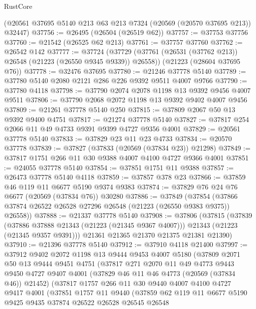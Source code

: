 \begin{lexlean}{RustCore}
\begin{coremodule}
    (@20561 @37695 @5140 @213 @63 @213 @7324 (@20569 (@20570 @37695 @213)) @32447)
@37756 := @26495 (@26504 (@26519 @62))
@37757 := @37753 @37756
@37760 := @21542 (@26525 @62 @213)
@37761 := @37757 @37760
@37762 := @26542 @142
@37777 := @37724
    (@37729 (@37761 (@26531 (@37762 @213)) @26548 (@21223 (@26550 @9345 @9339)) @26558))
    (@21223 (@28604 @37695 @76))
@37778 := @32476 @37695
@37780 := @21246 @37778 @5140
@37789 := @37780 @5140 @2080 @2121 @286 @226 @9392 @9511 @4007 @9766
@37790 := @37780 @4118
@37798 := @37790 @2074 @2078 @1198 @13 @9392 @9456 @4007 @9511
@37806 := @37790 @2068 @2072 @1198 @13 @9392 @9402 @4007 @9456
@37809 := @21261 @37778 @5140 @250
@37815 := @37809 @2067 @50 @13 @9392 @9400 @4751
@37817 := @21274 @37778 @5140
@37827 := @37817 @254 @2066 @11 @49 @4733 @9391 @9399 @4727 @9356 @4001
@37829 := @20561 @37778 @5140
@37833 := @37829 @23 @11 @23 @4733
@37834 := @20570 @37778
@37839 := @37827 (@37833 (@20569 (@37834 @23)) @21298)
@37849 := @37817 @1751 @266 @11 @30 @9388 @4007 @4100 @4727 @9366 @4001
@37851 := @24055 @37778 @5140
@37854 := @37851 @1751 @11 @9388
@37857 := @26473 @37778 @5140 @4118
@37859 := @37857 @378 @23
@37866 := @37859 @46 @119 @11 @6677 @5190 @9374 @9383
@37874 := @37829 @76 @24 @76 @6677 (@20569 (@37834 @76)) @30280
@37886 := @37849
    (@37854 (@37866 @37874 @26522 @26528 @27296 @26548 (@21223 (@26550 @9383 @9375)) @26558))
@37888 := @21337 @37778 @5140
@37908 := @37806
    (@37815
      (@37839
        (@37886 @37888 @21343 (@21223 (@21345 @9367 @4007)))
        @21343
        (@21223 (@21345 @9357 @9391)))
      @21361
      @21365
      @21370
      @21375
      @21381
      @21390)
@37910 := @21396 @37778 @5140
@37912 := @37910 @4118 @21400
@37997 := @37912
    @9402
    @2072
    @1198
    @13
    @9444
    @9453
    @4007
    @5180
    (@37809
      @2071
      @50
      @13
      @9444
      @9451
      @4751
      (@37817
        @271
        @2070
        @11
        @49
        @4773
        @9443
        @9450
        @4727
        @9407
        @4001
        (@37829 @46 @11 @46 @4773 (@20569 (@37834 @46)) @21452)
        (@37817
          @1757
          @266
          @11
          @30
          @9440
          @4007
          @4100
          @4727
          @9417
          @4001
          (@37851
            @1757
            @11
            @9440
            (@37859
              @62
              @119
              @11
              @6677
              @5190
              @9425
              @9435
              @37874
              @26522
              @26528
              @26545
              @26548

\end{coremodule}
\end{lexlean}
